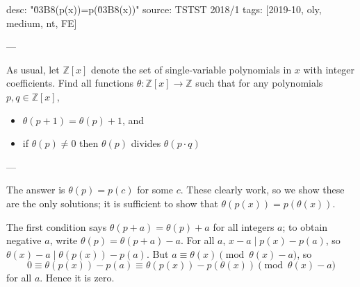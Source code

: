 desc: "\u03B8(p(x))=p(\u03B8(x))"
source: TSTST 2018/1
tags: [2019-10, oly, medium, nt, FE]

---

As usual, let $\mathbb Z[x]$ denote the set of single-variable polynomials in $x$ with integer coefficients. Find all functions $\theta:\mathbb Z[x]\to\mathbb Z$ such that for any polynomials $p,q\in\mathbb Z[x]$,
\begin{itemize}[itemsep=0em]
    \item $\theta(p+1)=\theta(p)+1$, and
    \item if $\theta(p)\ne0$ then $\theta(p)$ divides $\theta(p\cdot q)$
\end{itemize}

---

The answer is $\theta(p)=p(c)$ for some $c$. These clearly work, so we show these are the only solutions; it is sufficient to show that $\theta(p(x))=p(\theta(x))$.

The first condition says $\theta(p+a)=\theta(p)+a$ for all integers $a$; to obtain negative $a$, write $\theta(p)=\theta(p+a)-a$. For all $a$, $x-a\mid p(x)-p(a)$, so $\theta(x)-a\mid\theta(p(x))-p(a)$. But $a\equiv\theta(x)\pmod{\theta(x)-a}$, so \[0\equiv\theta(p(x))-p(a)\equiv\theta(p(x))-p(\theta(x))\pmod{\theta(x)-a}\]
for all $a$. Hence it is zero.
